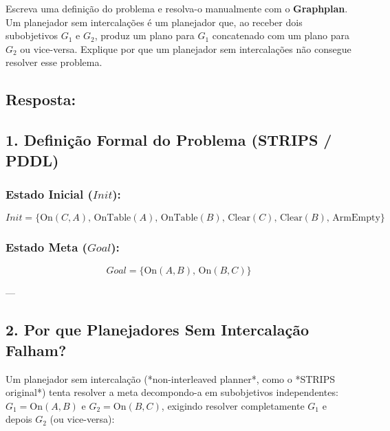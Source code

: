 \documentclass[a4paper,12pt]{article}
\begin{document}
Escreva uma definição do problema e resolva-o manualmente com o \textbf{Graphplan}. Um planejador sem intercalações é um planejador que, ao receber dois subobjetivos $G_1$ e $G_2$, produz um plano para $G_1$ concatenado com um plano para $G_2$ ou vice-versa. Explique por que um planejador sem intercalações não consegue resolver esse problema.


\subsection*{Resposta:}

\bigskip


\subsection*{1. Definição Formal do Problema (STRIPS / PDDL)}

\subsubsection*{Estado Inicial ($Init$):}
\begin{equation}
	Init = \{ \text{On}(C, A), \, \text{OnTable}(A), \, \text{OnTable}(B), \, \text{Clear}(C), \, \text{Clear}(B), \, \text{ArmEmpty} \}
\end{equation}

\subsubsection*{Estado Meta ($Goal$):}
\begin{equation}
	Goal = \{ \text{On}(A, B), \, \text{On}(B, C) \}
\end{equation}

---

\subsection*{2. Por que Planejadores Sem Intercalação Falham?}

Um planejador sem intercalação (*non-interleaved planner*, como o *STRIPS original*) tenta resolver a meta decompondo-a em subobjetivos independentes: $G_1 = \text{On}(A, B)$ e $G_2 = \text{On}(B, C)$, exigindo resolver completamente $G_1$ e depois $G_2$ (ou vice-versa):
\end{document}

